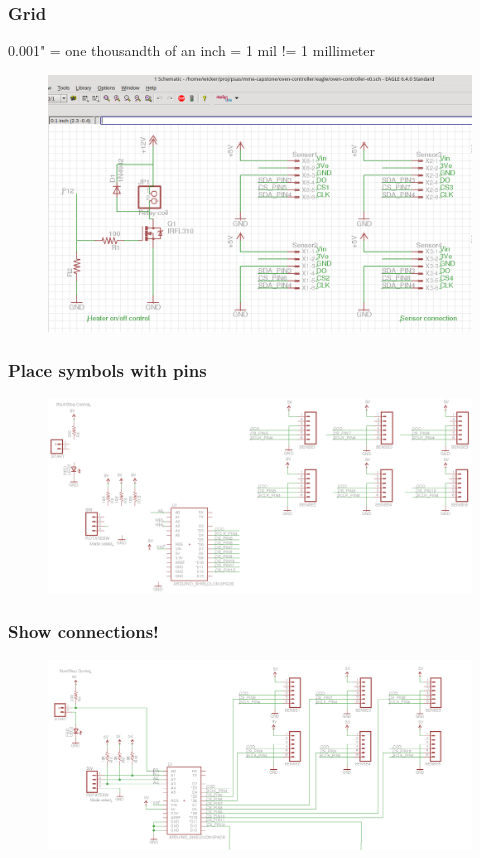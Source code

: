\documentclass{beamer}
\begin{document}
\begin{frame}
\frametitle{Grid}
0.001" = one thousandth of an inch = 1 mil != 1 millimeter
\begin{figure}
\includegraphics[width=1.0\linewidth]{grid.png}
\end{figure}
\end{frame}


\begin{frame}
\frametitle{Place symbols with pins}
\begin{figure}
\includegraphics[width=1\linewidth]{symbols.png}
\end{figure}
\end{frame}


\begin{frame}
\frametitle{Show connections!}
\begin{figure}
\includegraphics[width=1\linewidth]{symbols-connected.png}
\end{figure}
\end{frame}
\end{document}
